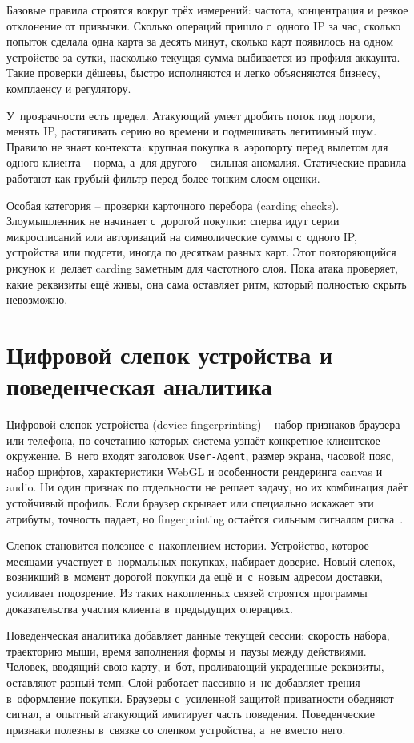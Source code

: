 Базовые правила строятся вокруг трёх измерений: частота, концентрация
и резкое отклонение от привычки. Сколько операций пришло с~одного IP
за час, сколько попыток сделала одна карта за десять минут, сколько
карт появилось на одном устройстве за сутки, насколько текущая сумма
выбивается из профиля аккаунта. Такие проверки дёшевы, быстро
исполняются и легко объясняются бизнесу, комплаенсу и регулятору.

У~прозрачности есть предел. Атакующий умеет дробить поток под пороги,
менять IP, растягивать серию во времени и подмешивать легитимный шум.
Правило не знает контекста: крупная покупка в~аэропорту перед вылетом
для одного клиента -- норма, а~для другого -- сильная аномалия.
Статические правила работают как грубый фильтр перед более тонким
слоем оценки.

Особая категория -- проверки карточного перебора (carding checks).
Злоумышленник не начинает с~дорогой покупки: сперва идут серии
микросписаний или авторизаций на символические суммы с~одного IP,
устройства или подсети, иногда по десяткам разных карт. Этот
повторяющийся рисунок и~делает carding заметным для частотного слоя.
Пока атака проверяет, какие реквизиты ещё живы, она сама оставляет
ритм, который полностью скрыть невозможно.

\section{Цифровой слепок устройства и поведенческая аналитика}\label{sec:fraud-fingerprint}

Цифровой слепок устройства (device fingerprinting) -- набор признаков
браузера или телефона, по сочетанию которых система узнаёт конкретное
клиентское окружение. В~него входят заголовок \texttt{User-Agent},
размер экрана, часовой пояс, набор шрифтов, характеристики WebGL
и особенности рендеринга canvas и audio. Ни один признак по отдельности
не решает задачу, но их комбинация даёт устойчивый профиль. Если
браузер скрывает или специально искажает эти атрибуты, точность падает,
но fingerprinting остаётся сильным сигналом
риска~\cite{eckersley-fingerprinting-2010}.

Слепок становится полезнее с~накоплением истории. Устройство,
которое месяцами участвует в~нормальных покупках, набирает доверие.
Новый слепок, возникший в~момент дорогой покупки да ещё и~с~новым
адресом доставки, усиливает подозрение. Из таких накопленных связей
строятся программы доказательства участия клиента в~предыдущих
операциях.

Поведенческая аналитика добавляет данные текущей сессии: скорость
набора, траекторию мыши, время заполнения формы и~паузы между
действиями. Человек, вводящий свою карту, и~бот, проливающий
украденные реквизиты, оставляют разный темп. Слой работает пассивно
и~не добавляет трения в~оформление покупки. Браузеры с~усиленной
защитой приватности обедняют сигнал, а~опытный атакующий имитирует
часть поведения. Поведенческие признаки полезны в~связке со слепком
устройства, а~не вместо него.


